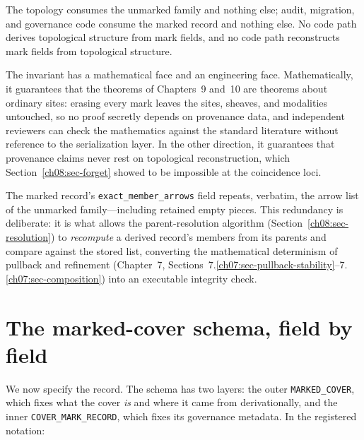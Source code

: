 \begin{invariant}\label{ch08:inv-consumers}
The topology consumes the unmarked family and nothing else; audit, migration, and governance code consume the marked record and nothing else. No code path derives topological structure from mark fields, and no code path reconstructs mark fields from topological structure.
\end{invariant}

The invariant has a mathematical face and an engineering face. Mathematically, it guarantees that the theorems of Chapters~9 and~10 are theorems about ordinary sites: erasing every mark leaves the sites, sheaves, and modalities untouched, so no proof secretly depends on provenance data, and independent reviewers can check the mathematics against the standard literature \cite{maclane, stacks00ZC} without reference to the serialization layer. In the other direction, it guarantees that provenance claims never rest on topological reconstruction, which Section~\ref{ch08:sec-forget} showed to be impossible at the coincidence loci.

\begin{remark}\label{ch08:rem-same-arrows}
The marked record's \texttt{exact\_member\_arrows} field repeats, verbatim, the arrow list of the unmarked family---including retained empty pieces. This redundancy is deliberate: it is what allows the parent-resolution algorithm (Section~\ref{ch08:sec-resolution}) to \emph{recompute} a derived record's members from its parents and compare against the stored list, converting the mathematical determinism of pullback and refinement (Chapter~7, Sections~7.\ref{ch07:sec-pullback-stability}--7.\ref{ch07:sec-composition}) into an executable integrity check.
\end{remark}

\section{The marked-cover schema, field by field}\label{ch08:sec-schema}

We now specify the record. The schema has two layers: the outer \texttt{MARKED\_COVER}, which fixes what the cover \emph{is} and where it came from derivationally, and the inner \texttt{COVER\_MARK\_RECORD}, which fixes its governance metadata. In the registered notation:

